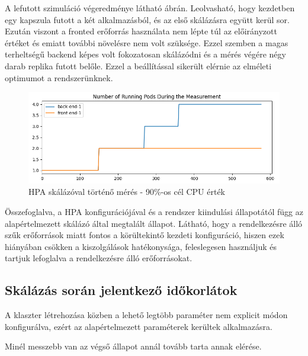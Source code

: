 A lefutott szimuláció végeredménye látható  ábrán.
Leolvasható, hogy kezdetben egy kapszula futott a két alkalmazásból, és az első skálázásra együtt kerül sor.
Ezután viszont a fronted erőforrás használata nem lépte túl az előirányzott értéket és emiatt további növelésre nem volt szüksége.
Ezzel szemben a magas terheltségű backend képes volt fokozatosan skálázódni és a mérés végére négy darab replika futott belőle.
Ezzel a beállítással sikerült elérnie az elméleti optimumot a rendszerünknek.

\begin{figure}[!ht]
	\centering
	\includegraphics[width=150mm, keepaspectratio]{figures/HPA-scaling-in-the-same-time_90_percent_2.png}
	\caption{HPA skálázóval történő mérés - 90\%-os cél CPU érték}
	\label{fig:HPA-scaling-in-the-same-time_90_percent}
\end{figure}

Összefoglalva, a HPA konfigurációjával és a rendszer kiindulási állapotától függ az alapértelmezett skálázó által megtalált állapot.
Látható, hogy a rendelkezésre álló szűk erőforrások miatt fontos a körültekintő kezdeti konfiguráció, hiszen ezek hiányában csökken a kiszolgálások hatékonysága, feleslegesen használjuk és tartjuk lefoglalva a rendelkezésre álló erőforrásokat.

\subsection{Skálázás során jelentkező időkorlátok}
A klaszter létrehozása közben a lehető legtöbb paraméter nem explicit módon konfigurálva, ezért az alapértelmezett paraméterek kerültek alkalmazásra.

Minél messzebb van az végső állapot annál tovább tarta annak elérése.
